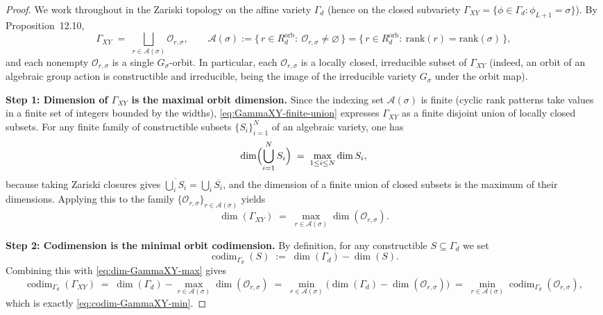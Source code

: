 \documentclass{article}
\newcommand{\codim}{\operatorname{codim}}
\theoremstyle{definition}
\begin{document}
\begin{proof}
We work throughout in the Zariski topology on the affine variety $\Gamma_d$ (hence on the closed subvariety
$\Gamma_{XY}=\{\phi\in \Gamma_d:\phi_{L+1}=\sigma\}$). By Proposition~12.10,
\begin{equation}\label{eq:GammaXY-finite-union}
\Gamma_{XY}
\;=\;
\bigsqcup_{r\in \mathcal A(\sigma)} \mathcal O_{r,\sigma},
\qquad
\mathcal A(\sigma):=\{\,r\in R^{\mathrm{orb}}_d:\ \mathcal O_{r,\sigma}\neq\varnothing\,\}
=
\{\,r\in R^{\mathrm{orb}}_d:\ \mathrm{rank}(r)=\mathrm{rank}(\sigma)\,\},
\end{equation}
and each nonempty $\mathcal O_{r,\sigma}$ is a single $G_\sigma$-orbit. In particular, each $\mathcal O_{r,\sigma}$ is a locally closed,
irreducible subset of $\Gamma_{XY}$ (indeed, an orbit of an algebraic group action is constructible and irreducible, being the image of the
irreducible variety $G_\sigma$ under the orbit map).

\medskip
\noindent\textbf{Step 1: Dimension of $\Gamma_{XY}$ is the maximal orbit dimension.}
Since the indexing set $\mathcal A(\sigma)$ is finite (cyclic rank patterns take values in a finite set of integers bounded by the widths),
\eqref{eq:GammaXY-finite-union} expresses $\Gamma_{XY}$ as a finite disjoint union of locally closed subsets.
For any finite family of constructible subsets $\{S_i\}_{i=1}^N$ of an algebraic variety, one has
\[
\dim\Bigl(\bigcup_{i=1}^N S_i\Bigr) \;=\; \max_{1\le i\le N}\dim S_i,
\]
because taking Zariski closures gives
$\overline{\bigcup_i S_i}=\bigcup_i \overline{S_i}$, and the dimension of a finite union of closed subsets is the maximum of their dimensions.
Applying this to the family $\{\mathcal O_{r,\sigma}\}_{r\in\mathcal A(\sigma)}$ yields
\begin{equation}\label{eq:dim-GammaXY-max}
\dim(\Gamma_{XY}) \;=\; \max_{r\in\mathcal A(\sigma)} \dim(\mathcal O_{r,\sigma}).
\end{equation}

\medskip
\noindent\textbf{Step 2: Codimension is the minimal orbit codimension.}
By definition, for any constructible $S\subseteq \Gamma_d$ we set
\[
\codim_{\Gamma_d}(S)\;:=\;\dim(\Gamma_d)-\dim(S).
\]
Combining this with \eqref{eq:dim-GammaXY-max} gives
\[
\codim_{\Gamma_d}(\Gamma_{XY})
\;=\;
\dim(\Gamma_d)-\max_{r\in\mathcal A(\sigma)}\dim(\mathcal O_{r,\sigma})
\;=\;
\min_{r\in\mathcal A(\sigma)}\bigl(\dim(\Gamma_d)-\dim(\mathcal O_{r,\sigma})\bigr)
\;=\;
\min_{r\in\mathcal A(\sigma)} \codim_{\Gamma_d}(\mathcal O_{r,\sigma}),
\]
which is exactly \eqref{eq:codim-GammaXY-min}.


\end{proof}
\end{document}
